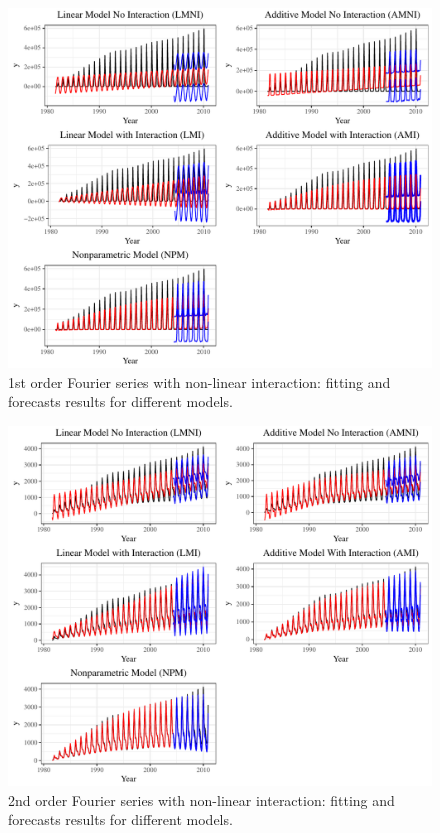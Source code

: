 \documentclass{article}\usepackage[]{graphicx}\usepackage[]{color}
\begin{document}
\begin{figure}[bp!]
\centering
\includegraphics[scale=0.7]{1st_order_complex.pdf}
\caption{1st order Fourier series with non-linear interaction: fitting and forecasts results for different models.}
\label{fig:1st Fourier complex inter}
\end{figure}


\begin{figure}[bp!]
\centering
\includegraphics[scale=0.7]{2nd_order_complex.pdf}
\caption{2nd order Fourier series with non-linear interaction: fitting and forecasts results for different models.}
\label{fig:2nd Fourier complex inter}
\end{figure}
\end{document}
